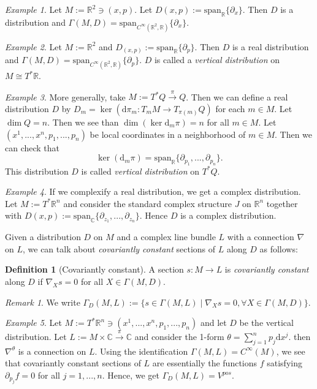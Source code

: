 \documentclass[12pt]{amsart}
\numberwithin{equation}{section}
\theoremstyle{plain}
\theoremstyle{definition}
\newtheorem{defn}{Definition}[subsection]
\theoremstyle{remark}
\newtheorem{rem}{Remark}[subsection]
\newtheorem{ex}{Example}[subsection]
\newcommand{\R}{\mathbb{R}}
\newcommand{\dd}{{\mathrm{d}}}
\begin{document}
\begin{ex}
Let $M:=\R^2\ni(x,p)$. Let $D(x,p):=\mathrm{span}_\R\{\partial_x\}$. Then $D$ is a distribution and $\Gamma(M,D)=\mathrm{span}_{C^\infty(\R^2,\R)}\{\partial_x\}$.
\end{ex}

\begin{ex}
Let $M:=\R^2$ and $D_{(x,p)}:=\mathrm{span}_\R\{\partial_p\}$. Then $D$ is a real distribution and $\Gamma(M,D)=\mathrm{span}_{C^\infty(\R^2,\R)}\{\partial_p\}$. $D$ is called a \emph{vertical distribution} on $M\cong T^*\R$. 
\end{ex}

\begin{ex}
More generally, take $M:=T^*Q\xrightarrow{\pi}Q$. Then we can define a real distribution $D$ by $D_m=\ker(\dd\pi_m\colon T_mM\to T_{\pi(m)}Q)$ for each $m\in M$. Let $\dim Q=n$. Then we see than $\dim (\ker\dd_m\pi)=n$ for all $m\in M$. Let $(x^1,...,x^n,p_1,...,p_n)$ be local coordinates in a neighborhood of $m\in M$. Then we can check that $$\ker(\dd_m\pi)=\mathrm{span}_\R\{\partial_{p_1},...,\partial_{p_n}\}.$$ This distribution $D$ is called \emph{vertical distribution} on $T^*Q$.
\end{ex}

\begin{ex}
If we complexify a real distribution, we get a complex distribution. Let $M:=T^*\R^n$ and consider the standard complex structure $J$ on $\R^n$ together with $D(x,p):=\mathrm{span}_\mathbb{C}\{\partial_{z_1},...,\partial_{z_n}\}$. Hence $D$ is a complex distribution. 
\end{ex}

Given a distribution $D$ on $M$ and a complex line bundle $L$ with a connection $\nabla$ on $L$, we can talk about \emph{covariantly constant} sections of $L$ along $D$ as follows:

\begin{defn}[Covariantly constant]
A section $s\colon M\to L$ is \emph{covariantly constant} along $D$ if $\nabla_Xs=0$ for all $X\in \Gamma(M,D)$.
\end{defn}

\begin{rem}
We write $\Gamma_D(M,L):=\{s\in\Gamma(M,L)\mid \nabla_Xs=0,\forall X\in\Gamma(M,D)\}$.
\end{rem}

\begin{ex}
\label{ex:example1}
Let $M:=T^*\R^n\ni (x^1,...,x^n,p_1,...,p_n)$ and let $D$ be the vertical distribution. Let $L:=M\times\mathbb{C}\xrightarrow{\pi}\mathbb{C}$ and consider the 1-form $\theta=\sum_{j=1}^np_j\dd x^j$. then $\nabla^\theta$ is a connection on $L$. Using the identification $\Gamma(M,L)=C^\infty(M)$, we see that covariantly constant sections of $L$ are essentially the functions $f$ satisfying $\partial_{p_j}f=0$ for all $j=1,...,n$. Hence, we get $\Gamma_D(M,L)= V^{pos}$.
\end{ex}
\end{document}
